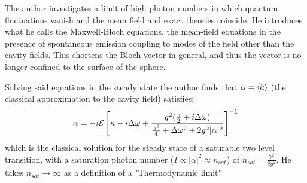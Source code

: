 The author investigates a limit of high photon numbers in which quantum fluctuations vanish and the mean field and exact theories coincide. He introduces what he calls the Maxwell-Bloch equations, the mean-field equations in the presence of spontaneous emission coupling to modes of the field other than the cavity fields. This shortens the Bloch vector in general, and thus the vector is no longer confined to the surface of the sphere. 

Solving said equations in the steady state the author finds that $\alpha = \langle \hat{a} \rangle$ (the classical approximation to the cavity field) satisfies:
\begin{equation}
	\alpha = -i \mathcal{E} \left [ \kappa - i \Delta \omega + \frac{g^2(\frac{\gamma}{2} +i \Delta \omega)}{\frac{\gamma^2}{4} + \Delta \omega^2 + 2 g^2 |\alpha|^2} \right ]^{-1}
\end{equation}
which is the classical solution for the steady state of a saturable two level transition, with a saturation photon number ($I \propto |\alpha|^2 \approx n_{sat}$) of $n_{sat} = \frac{\gamma^2}{8g^2}$. He takes $n_{sat} \rightarrow \infty$ as a definition of a "Thermodynamic limit" 